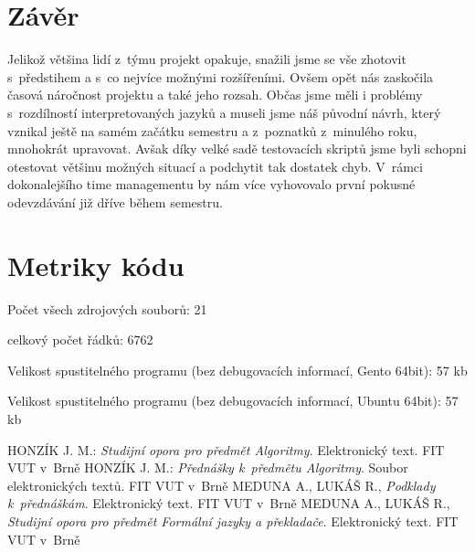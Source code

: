 \documentclass[12pt,a4paper,titlepage,final]{article}
\begin{document}
\section{Závěr} \label{zaver}
Jelikož většina lidí z~týmu projekt opakuje, snažili jsme se vše zhotovit s~předstihem a s~co nejvíce možnými rozšířeními. Ovšem opět nás zaskočila časová náročnost projektu a také jeho rozsah. Občas jsme měli i problémy s~rozdílností interpretovaných jazyků a museli jsme náš původní návrh, který vznikal ještě na samém začátku semestru a z~poznatků z~minulého roku, mnohokrát upravovat. Avšak díky velké sadě testovacích skriptů jsme byli schopni otestovat většinu možných situací a podchytit tak dostatek chyb. V~rámci dokonalejšího time managementu by nám více vyhovovalo první pokusné odevzdávání již dříve během semestru.

\appendix

\section{Metriky kódu} \label{metriky}
Počet všech zdrojových souborů: 21

celkový počet řádků: 6762

Velikost spustitelného programu (bez debugovacích informací, Gento 64bit): 57 kb

Velikost spustitelného programu (bez debugovacích informací, Ubuntu 64bit): 57 kb


\begin{thebibliography}{1}

HONZÍK J. M.: \emph{Studijní opora pro předmět Algoritmy}. Elektronický text. FIT VUT v~Brně
HONZÍK J. M.: \emph{Přednášky k~předmětu Algoritmy}. Soubor elektronických textů. FIT VUT v~Brně
MEDUNA A., LUKÁŠ R., \emph{Podklady k~přednáškám}. Elektronický text. FIT VUT v~Brně
MEDUNA A., LUKÁŠ R., \emph{Studijní opora pro předmět Formální jazyky a překladače}. Elektronický text. FIT VUT v~Brně


\end{thebibliography}
\appendix
\end{document}
